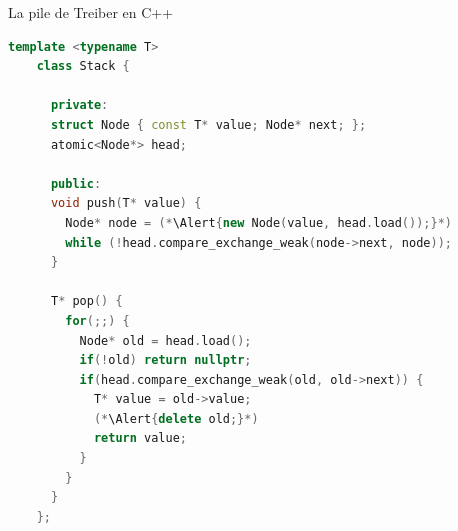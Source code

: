 
\begingroup

\begin{frame}[fragile]{La pile de Treiber en C++}

  \begin{lstlisting}[gobble=4, language=c++]
    template <typename T>
    class Stack {

      private:
      struct Node { const T* value; Node* next; };
      atomic<Node*> head;

      public:
      void push(T* value) {
        Node* node = (*\Alert{new Node(value, head.load());}*)
        while (!head.compare_exchange_weak(node->next, node));
      }

      T* pop() {
        for(;;) {
          Node* old = head.load();
          if(!old) return nullptr;
          if(head.compare_exchange_weak(old, old->next)) {
            T* value = old->value;
            (*\Alert{delete old;}*)
            return value;
          }
        }
      }
    };
  \end{lstlisting}

  
\end{frame}

\endgroup
\endinput
